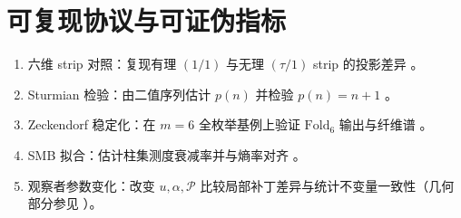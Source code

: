 \section{可复现协议与可证伪指标}

\begin{enumerate}
  \item 六维 strip 对照：复现有理 $(1/1)$ 与无理 $(\tau/1)$ strip 的投影差异 \cite{PRB46_6091}。
  \item Sturmian 检验：由二值序列估计 $p(n)$ 并检验 $p(n)=n+1$ \cite{CambridgeSturmianWordsLothaire}。
  \item Zeckendorf 稳定化：在 $m=6$ 全枚举基例上验证 $\mathrm{Fold}_6$ 输出与纤维谱 \cite{PlanetMathZeckendorfCombinatorial}。
  \item SMB 拟合：估计柱集测度衰减率并与熵率对齐 \cite{GatechSMB}。
  \item 观察者参数变化：改变 $u,\alpha,\mathcal{P}$ 比较局部补丁差异与统计不变量一致性（几何部分参见 \cite{IUCRAcceptanceDomain}）。
\end{enumerate}

